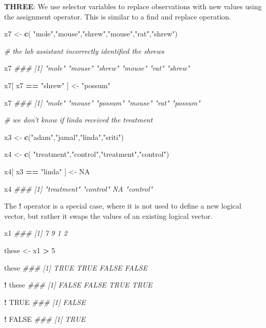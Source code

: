 \documentclass[]{book}
\newenvironment{Shaded}{\begin{snugshade}}{\end{snugshade}}
\newcommand{\CommentTok}[1]{\textcolor[rgb]{0.56,0.35,0.01}{\textit{#1}}}
\newcommand{\DecValTok}[1]{\textcolor[rgb]{0.00,0.00,0.81}{#1}}
\newcommand{\KeywordTok}[1]{\textcolor[rgb]{0.13,0.29,0.53}{\textbf{#1}}}
\newcommand{\NormalTok}[1]{#1}
\newcommand{\OperatorTok}[1]{\textcolor[rgb]{0.81,0.36,0.00}{\textbf{#1}}}
\newcommand{\OtherTok}[1]{\textcolor[rgb]{0.56,0.35,0.01}{#1}}
\newcommand{\StringTok}[1]{\textcolor[rgb]{0.31,0.60,0.02}{#1}}
\theoremstyle{definition}
\theoremstyle{definition}
\theoremstyle{definition}
\theoremstyle{remark}
\begin{document}
\textbf{THREE}: We use selector variables to replace observations with
new values using the assignment operator. This is similar to a find and
replace operation.

\begin{Shaded}
\begin{Highlighting}[]

\NormalTok{x7 <-}\StringTok{ }\KeywordTok{c}\NormalTok{( }\StringTok{"mole"}\NormalTok{,}\StringTok{"mouse"}\NormalTok{,}\StringTok{"shrew"}\NormalTok{,}\StringTok{"mouse"}\NormalTok{,}\StringTok{"rat"}\NormalTok{,}\StringTok{"shrew"}\NormalTok{)}

\CommentTok{# the lab assistant incorrectly identified the shrews}

\NormalTok{x7}
\CommentTok{### [1] "mole"  "mouse" "shrew" "mouse" "rat"   "shrew"}

\NormalTok{x7[ x7 }\OperatorTok{==}\StringTok{ "shrew"}\NormalTok{ ] <-}\StringTok{ "possum"}

\NormalTok{x7}
\CommentTok{### [1] "mole"   "mouse"  "possum" "mouse"  "rat"    "possum"}


\CommentTok{# we don't know if linda received the treatment}

\NormalTok{x3 <-}\StringTok{ }\KeywordTok{c}\NormalTok{(}\StringTok{"adam"}\NormalTok{,}\StringTok{"jamal"}\NormalTok{,}\StringTok{"linda"}\NormalTok{,}\StringTok{"sriti"}\NormalTok{)}

\NormalTok{x4 <-}\StringTok{ }\KeywordTok{c}\NormalTok{( }\StringTok{"treatment"}\NormalTok{,}\StringTok{"control"}\NormalTok{,}\StringTok{"treatment"}\NormalTok{,}\StringTok{"control"}\NormalTok{)}

\NormalTok{x4[ x3 }\OperatorTok{==}\StringTok{ "linda"}\NormalTok{ ] <-}\StringTok{ }\OtherTok{NA}

\NormalTok{x4}
\CommentTok{### [1] "treatment" "control"   NA          "control"}
\end{Highlighting}
\end{Shaded}

The \textbf{!} operator is a special case, where it is not used to
define a new logical vector, but rather it swaps the values of an
existing logical vector.

\begin{Shaded}
\begin{Highlighting}[]

\NormalTok{x1}
\CommentTok{### [1] 7 9 1 2}

\NormalTok{these <-}\StringTok{ }\NormalTok{x1 }\OperatorTok{>}\StringTok{ }\DecValTok{5}

\NormalTok{these}
\CommentTok{### [1]  TRUE  TRUE FALSE FALSE}

\OperatorTok{!}\StringTok{ }\NormalTok{these}
\CommentTok{### [1] FALSE FALSE  TRUE  TRUE}

\OperatorTok{!}\StringTok{ }\OtherTok{TRUE}
\CommentTok{### [1] FALSE}

\OperatorTok{!}\StringTok{ }\OtherTok{FALSE}
\CommentTok{### [1] TRUE}
\end{Highlighting}
\end{Shaded}
\end{document}
